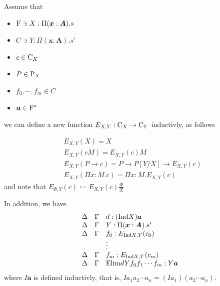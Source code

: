 Assume that 

\begin{itemize}
  \item $\mathrm{F} \ni X : \Pi (\boldsymbol{x}: \boldsymbol{A}).s $
  \item $C \ni Y :  \Pi (\bm x: \bm A).s'$
  \item $c \in \mathrm{C}_X$
  \item $P \in \mathrm{P}_X$
  \item $f_0, \cdots, f_m \in C$
  \item $\boldsymbol{a} \in \mathrm{F}^*$
\end{itemize}
we can define a new function $E_{X, Y} : \mathrm{C}_X \to \mathrm{C}_Y$ inductivly, as follows

\begin{align*}
  &E_{X, Y}(X) = X\\
  &E_{X, Y}(c M) =  E_{X, Y}(c) M\\
  &E_{X, Y}(P \to c) = P \to P[Y/X] \to E_{X, Y}(c) \\
  &E_{X, Y}(\Pi x: M.c) = \Pi x: M. E_{X, Y}(c)
\end{align*}
and note that $E_{\Phi, Y}(c) := E_{X, Y}(c) \frac{\Phi}{X}$ 

% 
% 
% 
In addition, we have
\[
  \begin{array}{lll}
    \Delta   &\Gamma   & d: (\mathrm{Ind} X) \boldsymbol{a}  \\
    \Delta   &\Gamma   & Y : \Pi (\boldsymbol{x}: \boldsymbol{A}).s' \\
    \Delta   &\Gamma   & f_0 : E_{\mathrm{Ind} X, Y}(c_0) \\
             &         & \vdots \\
    \Delta   &\Gamma   & f_m : E_{\mathrm{Ind} X, Y}(c_m) \\
    \Delta   &\Gamma   & \mathrm{Elim} d Y f_0 f_1 \cdots f_m : Y \boldsymbol{a}
  \end{array}
\]
where $I \bm a$ is defined inductivly, that is, $I a_1 a_2 \cdots a_n = (I a_1) (a_2 \cdots a_n)$.



